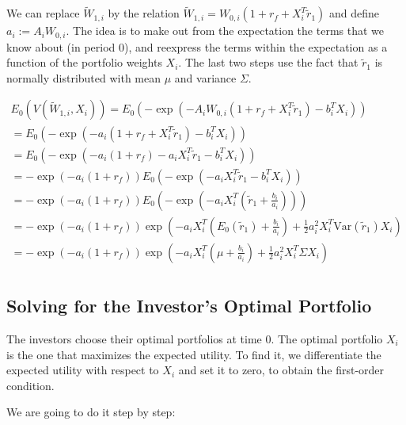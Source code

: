 We can replace $\tilde{W}_{1,i}$ by the relation 
$\tilde{W}_{1,i} = W_{0,i}(1 + r_f + X_i^T \tilde{r}_1)$
 and define $a_i := A_i W_{0,i}$. The idea is to make out from the
expectation the terms that we know about (in period 0), and reexpress 
the terms within the expectation as a function of the
portfolio weights $X_i$. The last two steps use the fact that 
$\tilde{r}_1$ is normally distributed with mean $\mu$ and variance $\Sigma$.

\begin{equation}
    \begin{aligned}
    E_0(V(\tilde{W}_{1,i}, X_i)) = E_0(-\exp{(-A_i W_{0,i}(1 + r_f + X_i^T \tilde{r}_1)-b_i^T X_i)}) \\
    = E_0(-\exp{(-a_i(1 + r_f + X_i^T \tilde{r}_1)-b_i^T X_i)})  \\
    = E_0(-\exp{(-a_i(1 + r_f) - a_i X_i^T \tilde{r}_1 - b_i^T X_i)}) \\
    = -\exp{(-a_i(1 + r_f))} E_0(-\exp{(-a_i X_i^T \tilde{r}_1 - b_i^T X_i)}) \\
    = -\exp{(-a_i(1 + r_f))} E_0(-\exp{(-a_i X_i^T (\tilde{r}_1 + \frac{b_i}{a_i}))})  \\
    = -\exp{(-a_i (1 + r_f))} \exp{(-a_i X_i^T (E_0(\tilde{r}_1) + \frac{b_i}{a_i})+\frac{1}{2}a_i^2 X_i^T \text{Var}(\tilde{r}_1)X_i)} \\
    = -\exp{(-a_i (1 + r_f))} \exp{(-a_i X_i^T (\mu + \frac{b_i}{a_i})+\frac{1}{2}a_i^2 X_i^T \Sigma X_i)} \\
    \end{aligned}
\end{equation}

\subsection{Solving for the Investor's Optimal Portfolio}

The investors choose their optimal portfolios at time 0. 
The optimal portfolio $X_i$ is the one that maximizes the expected utility.
To find it, we differentiate the expected utility with respect to $X_i$ and 
set it to zero, to obtain the first-order condition.

We are going to do it step by step:

